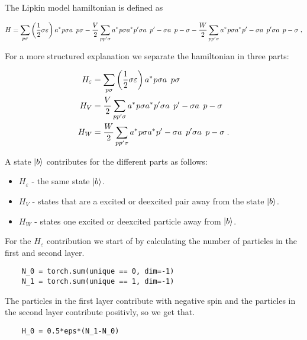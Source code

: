 The Lipkin model hamiltonian is defined as

\begin{equation} 
    H = \sum_{p\sigma} \left ( \frac{1}{2} \sigma \varepsilon \right ) \hc{a}{p\sigma}\op{a}{p\sigma} - \frac{V}{2}\sum_{pp'\sigma} \hc{a}{p\sigma} \hc{a}{p'\sigma} \op{a}{p'-\sigma}\op{a}{p-\sigma} - \frac{W}{2} \sum_{pp'\sigma} \hc{a}{p\sigma} \hc{a}{p'-\sigma} \op{a}{p'\sigma}\op{a}{p-\sigma} \; , 
\end{equation}

For a more structured explanation we separate the hamiltonian in three parts:

\begin{align}
  H_{\varepsilon} &= \sum_{p\sigma} \left ( \frac{1}{2} \sigma \varepsilon \right ) \hc{a}{p\sigma}\op{a}{p\sigma}\\ 
  H_V &= \frac{V}{2}\sum_{pp'\sigma} \hc{a}{p\sigma} \hc{a}{p'\sigma} \op{a}{p'-\sigma}\op{a}{p-\sigma}\\
  H_W &= \frac{W}{2} \sum_{pp'\sigma} \hc{a}{p\sigma} \hc{a}{p'-\sigma} \op{a}{p'\sigma}\op{a}{p-\sigma}  \; .
  \label{eq:LMG_split_H}
\end{align}

 A state $\ket{b}$ contributes for the different parts as follows:

\begin{itemize}
  \item $H_{\varepsilon}$ - the same state $\ket{b}$.
  \item $H_V$ - states that are a excited or deexcited pair away from the state $\ket{b}$.
  \item $H_W$ - states one excited or deexcited particle away from $\ket{b}$.
\end{itemize}

For the $H_{\varepsilon}$ contribution we start of by calculating the number of particles in the first and second layer.

\begin{verbatim}
    N_0 = torch.sum(unique == 0, dim=-1)
    N_1 = torch.sum(unique == 1, dim=-1)
\end{verbatim}

The particles in the first layer contribute with negative spin and the particles in the second layer contribute positivly, so we get that.

\begin{verbatim} 
    H_0 = 0.5*eps*(N_1-N_0)
\end{verbatim}

